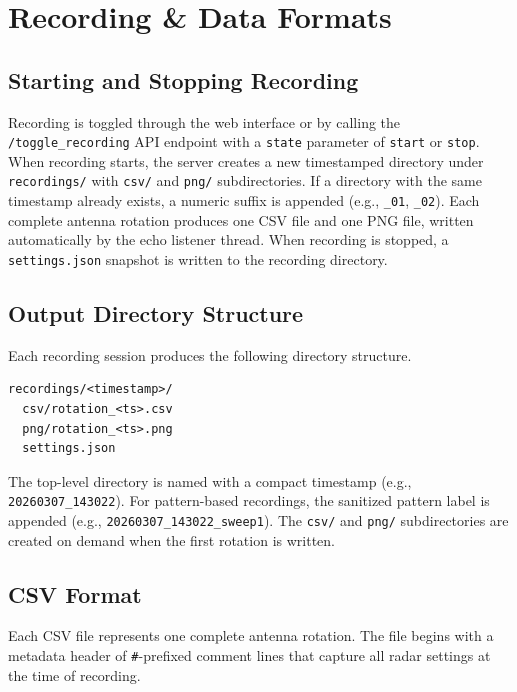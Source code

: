 \documentclass[11pt,letterpaper]{article}
\begin{document}
\newpage
\section{Recording \& Data Formats}
\label{sec:recording}

\subsection{Starting and Stopping Recording}
\label{subsec:recording-toggle}

Recording is toggled through the web interface or by calling the \texttt{/toggle\_recording} API endpoint with a \texttt{state} parameter of \texttt{start} or \texttt{stop}. When recording starts, the server creates a new timestamped directory under \texttt{recordings/} with \texttt{csv/} and \texttt{png/} subdirectories. If a directory with the same timestamp already exists, a numeric suffix is appended (e.g., \texttt{\_01}, \texttt{\_02}). Each complete antenna rotation produces one CSV file and one PNG file, written automatically by the echo listener thread. When recording is stopped, a \texttt{settings.json} snapshot is written to the recording directory.

\subsection{Output Directory Structure}
\label{subsec:recording-directory}

Each recording session produces the following directory structure.

\begin{lstlisting}
recordings/<timestamp>/
  csv/rotation_<ts>.csv
  png/rotation_<ts>.png
  settings.json
\end{lstlisting}

The top-level directory is named with a compact timestamp (e.g., \texttt{20260307\_143022}). For pattern-based recordings, the sanitized pattern label is appended (e.g., \texttt{20260307\_143022\_sweep1}). The \texttt{csv/} and \texttt{png/} subdirectories are created on demand when the first rotation is written.

\subsection{CSV Format}
\label{subsec:csv-format}

Each CSV file represents one complete antenna rotation. The file begins with a metadata header of \texttt{\#}-prefixed comment lines that capture all radar settings at the time of recording.
\end{document}
